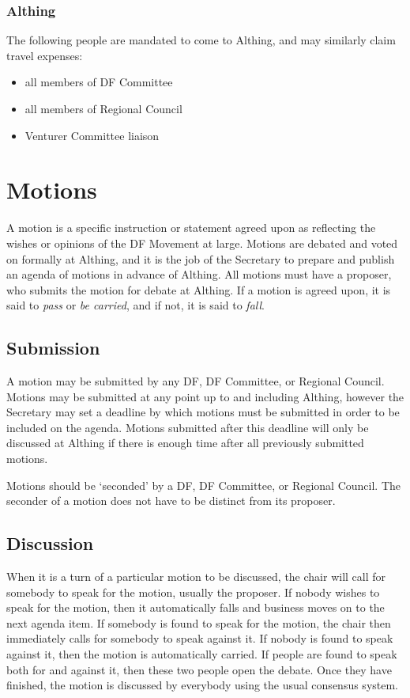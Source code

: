 \documentclass[a4paper, 11pt]{article} %
\begin{document}
\subsubsection{Althing}
The following people are mandated to come to Althing, and may similarly claim travel expenses:
\begin{itemize}
\item all members of DF Committee
\item all members of Regional Council
\item Venturer Committee liaison
\end{itemize}

\section{Motions}
A motion is a specific instruction or statement agreed upon as reflecting the wishes or opinions of the DF Movement at large.  Motions are debated and voted on formally at Althing, and it is the job of the Secretary to prepare and publish an agenda of motions in advance of Althing.  All motions must have a proposer, who submits the motion for debate at Althing. If a motion is agreed upon, it is said to \emph{pass} or \emph{be carried}, and if not, it is said to \emph{fall}.

\subsection{Submission}
A motion may be submitted by any DF, DF Committee, or Regional Council.  Motions may be submitted at any point up to and including Althing, however the Secretary may set a deadline by which motions must be submitted in order to be included on the agenda.  Motions submitted after this deadline will only be discussed at Althing if there is enough time after all previously submitted motions.

Motions should be `seconded' by a DF, DF Committee, or Regional Council.  The seconder of a motion does not have to be distinct from its proposer.

\subsection{Discussion}
When it is a turn of a particular motion to be discussed, the chair will call for somebody to speak for the motion, usually the proposer.  If nobody wishes to speak for the motion, then it automatically falls and business moves on to the next agenda item.  If somebody is found to speak for the motion, the chair then immediately calls for somebody to speak against it.  If nobody is found to speak against it, then the motion is automatically carried.  If people are found to speak both for and against it, then these two people open the debate.  Once they have finished, the motion is discussed by everybody using the usual consensus system.
\end{document}

